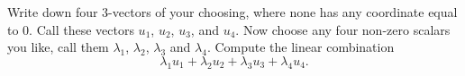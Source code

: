 \documentclass[elementsmain.tex]{subfiles}
\begin{document}
\begin{exercise}
Write down four $3$-vectors of your choosing, where none has any coordinate equal to $0$. Call these vectors $u_1$, $u_2$, $u_3$, and $u_4$. Now choose any four non-zero scalars you like, call them $\lambda_1$, $\lambda_2$, $\lambda_3$ and $\lambda_4$. Compute the linear combination
\[
\lambda_1 u_1 + \lambda_2 u_2 + \lambda_3 u_3 + \lambda_4 u_4. 
\]
\end{exercise}



\clearpage
\end{document}
